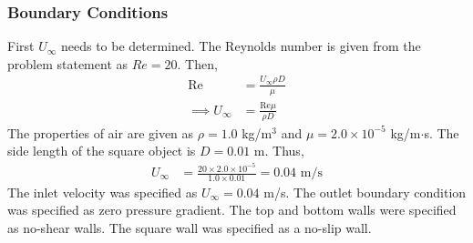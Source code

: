 \subsubsection{Boundary Conditions}
First $U_\infty$ needs to be determined. The Reynolds number is given from the problem statement as $Re = 20$. Then,
\begin{align*}
    \text{Re} &= \frac{U_\infty \rho D}{\mu} \\ 
    \implies U_\infty &= \frac{\text{Re} \mu}{\rho D}
\end{align*}
The properties of air are given as $\rho = 1.0$ kg/m$^3$ and $\mu = 2.0 \times 10^{-5}$ kg/m$\cdot$s. The side length of the square object is $D = 0.01$ m. Thus,
\begin{align*}
    U_\infty &= \frac{20 \times 2.0 \times 10^{-5}}{1.0 \times 0.01} = 0.04 \text{ m/s}
\end{align*}
The inlet velocity was specified as $U_\infty = 0.04$ m/s. The outlet boundary condition was specified as zero pressure gradient. The top and bottom walls were specified as no-shear walls. The square wall was specified as a no-slip wall.

